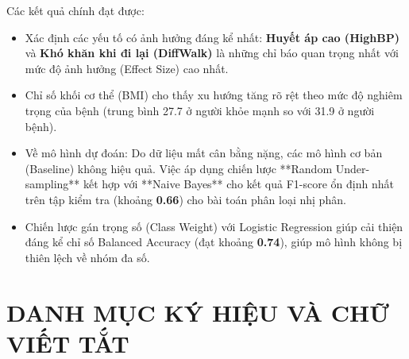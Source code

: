 \documentclass{article}
\begin{document}
Các kết quả chính đạt được:
\begin{itemize}
    \item Xác định các yếu tố có ảnh hưởng đáng kể nhất: \textbf{Huyết áp cao (HighBP)} và \textbf{Khó khăn khi đi lại (DiffWalk)} là những chỉ báo quan trọng nhất với mức độ ảnh hưởng (Effect Size) cao nhất.
    \item Chỉ số khối cơ thể (BMI) cho thấy xu hướng tăng rõ rệt theo mức độ nghiêm trọng của bệnh (trung bình 27.7 ở người khỏe mạnh so với 31.9 ở người bệnh).
    \item Về mô hình dự đoán: Do dữ liệu mất cân bằng nặng, các mô hình cơ bản (Baseline) không hiệu quả. Việc áp dụng chiến lược **Random Under-sampling** kết hợp với **Naive Bayes** cho kết quả F1-score ổn định nhất trên tập kiểm tra (khoảng \textbf{0.66}) cho bài toán phân loại nhị phân.
    \item Chiến lược gán trọng số (Class Weight) với Logistic Regression giúp cải thiện đáng kể chỉ số Balanced Accuracy (đạt khoảng \textbf{0.74}), giúp mô hình không bị thiên lệch về nhóm đa số.
\end{itemize}
\cleardoublepage


\section*{DANH MỤC KÝ HIỆU VÀ CHỮ VIẾT TẮT}
 {}
\end{document}
